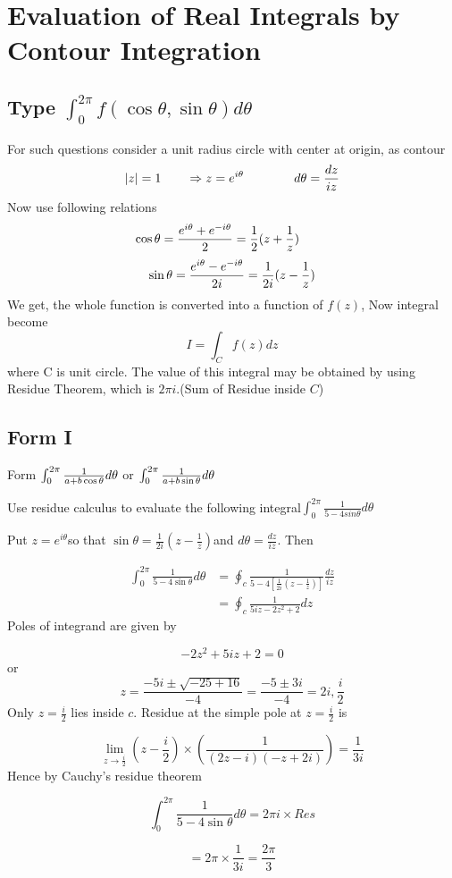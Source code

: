 \section{Evaluation of Real Integrals by Contour Integration}
\subsection*{Type $\int_0^{2 \pi} f(\cos \theta, \sin \theta) d\theta$}
For such questions consider a unit radius circle with center at origin, as contour
\[|z| = 1~~~~~~\Rightarrow    z=e^{i\theta}~~~~~~~~~~~~d\theta ={dz \over iz}\]
Now use following relations
\[\cos \theta = {e^{i\theta} + e^{-i\theta} \over 2}  = {1 \over 2}(z + {1 \over z}) ~~~~~~~\]
\[\sin \theta = {e^{i\theta} - e^{-i\theta} \over 2i}={1 \over 2i}(z - {1 \over z})\] 
We get, the whole function is converted into a function of $f(z)$, Now integral become 
\[I = \int_C f(z) dz\]
where C is unit circle. The value of this integral may be obtained by using Residue Theorem, which is $2\pi i.$(Sum of Residue inside $C$)
\subsection{Form I}
Form $\int_0^{2\pi} {1 \over a+b \cos\theta} d\theta$ or $\int_0^{2\pi} {1 \over a+b \sin\theta} d\theta$
\begin{example}
Use residue calculus to evaluate the following integral$\int_{0}^{2\pi}\frac{1}{5-4sin\theta}d\theta$
\end{example}

\begin{solution}
Put $z=e^{i\theta}$so that $\sin\theta=\frac{1}{2i}\left(z-\frac{1}{z}\right)$and
$d\theta=\frac{dz}{iz}$. Then 

\begin{align*}
\int_{0}^{2\pi}\frac{1}{5-4\sin\theta}d\theta & =\oint_{c}\frac{1}{5-4\left[\frac{1}{2i}\left(z-\frac{1}{z}\right)\right]}\frac{dz}{iz}\\
 & =\oint_{c}\frac{1}{5iz-2z^{2}+2}dz\end{align*}
Poles of integrand are given by 

\[
-2z^{2}+5iz+2=0\]
 or \[
z=\frac{-5i\pm\sqrt{-25+16}}{-4}=\frac{-5\pm3i}{-4}=2i,\frac{i}{2}\]
Only $z=\frac{i}{2}$ lies inside $c$. Residue at the simple pole
at $z=\frac{i}{2}$ is 

\[
\lim_{z\rightarrow\frac{i}{2}}\left(z-\frac{i}{2}\right)\times\left(\frac{1}{(2z-i)(-z+2i)}\right)=\frac{1}{3i}\]
Hence by Cauchy's residue theorem 

\[
\int_{0}^{2\pi}\frac{1}{5-4\sin\theta}d\theta=2\pi i\times Res\]


\[
=2\pi\times\frac{1}{3i}=\frac{2\pi}{3}\]
\end{solution}

